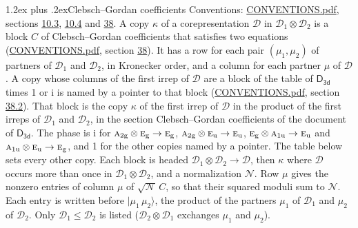 \documentclass[10pt,a4paper]{article}
\makeatletter
\renewcommand\section{\@startsection{section}{1}{\z@}{-3ex plus -1ex minus -.2ex}%
  {1.2ex plus .2ex}{\normalfont\large\sffamily\bfseries\color{parttitle}}}
\numberwithin{equation}{section}
\newcommand{\grp}[1]{\mathsf{#1}}
\newcommand{\irr}[1]{\text{\normalfont\scshape #1}}
\newcommand{\ptag}[1]{\mathrm{#1}}
\newcommand{\iunit}{\mathrm{i}}
\newcommand{\irrprod}{\otimes}
\newcommand{\mult}{\kappa}
\newcommand{\intx}{\mu}
\newcommand{\cgnorm}{\mathcal{N}}
\newcommand{\prodket}[2]{\lvert {#1}\,{#2}\rangle}
\makeatother
\begin{document}
\section{Clebsch--Gordan coefficients}\label{s:clebsch_gordan}
Conventions: \href{../../CONVENTIONS.pdf}{CONVENTIONS.pdf}, sections \href{../../../rotation/CONVENTIONS.pdf\#conv.10.3}{10.3}, \href{../../../rotation/CONVENTIONS.pdf\#conv.10.4}{10.4} and \href{../../CONVENTIONS.pdf\#conv.38}{38}.
\leavevmode\label{n:index.copy}\label{n:matrix.cg.stored}A copy $\mult$ of a corepresentation $\mathcal{D}$ in $\mathcal{D}_1\irrprod\mathcal{D}_2$ is a block $C$ of Clebsch--Gordan coefficients that satisfies two equations (\href{../../CONVENTIONS.pdf}{CONVENTIONS.pdf}, section \href{../../CONVENTIONS.pdf\#conv.38}{38}). \label{n:index.cg}It has a row for each pair $(\intx_1, \intx_2)$ of partners of $\mathcal{D}_1$ and $\mathcal{D}_2$, in Kronecker order, and a column for each partner $\intx$ of $\mathcal{D}$.
A copy whose columns of the first irrep of $\mathcal{D}$ are a block of the table of $\grp{D_{3d}}$ times 1 or $\iunit$ is named by a pointer to that block (\href{../../CONVENTIONS.pdf}{CONVENTIONS.pdf}, section \href{../../CONVENTIONS.pdf\#conv.38.2}{38.2}). That block is the copy $\mult$ of the first irrep of $\mathcal{D}$ in the product of the first irreps of $\mathcal{D}_1$ and $\mathcal{D}_2$, in the section Clebsch--Gordan coefficients of the document of \href{../../../rotation/data/pdf/D3d.pdf}{$\grp{D_{3d}}$}. The phase is $\iunit$ for $\irr{a}_{2\ptag{g}}\irrprod \irr{e}_{\ptag{g}}\to \irr{e}_{\ptag{g}}$, $\irr{a}_{2\ptag{g}}\irrprod \irr{e}_{\ptag{u}}\to \irr{e}_{\ptag{u}}$, $\irr{e}_{\ptag{g}}\irrprod \irr{a}_{1\ptag{u}}\to \irr{e}_{\ptag{u}}$ and $\irr{a}_{1\ptag{u}}\irrprod \irr{e}_{\ptag{u}}\to \irr{e}_{\ptag{g}}$, and 1 for the other copies named by a pointer. The table below sets every other copy.
Each block is headed $\mathcal{D}_1\irrprod\mathcal{D}_2\to\mathcal{D}$, then $\mult$ where $\mathcal{D}$ occurs more than once in $\mathcal{D}_1\irrprod\mathcal{D}_2$, and a normalization $\cgnorm$. Row $\intx$ gives the nonzero entries of column $\intx$ of $\sqrt{\cgnorm}\,C$, so that their squared moduli sum to $\cgnorm$. \label{n:vector.ket.product}Each entry is written before $\prodket{\intx_1}{\intx_2}$, the product of the partners $\intx_1$ of $\mathcal{D}_1$ and $\intx_2$ of $\mathcal{D}_2$. Only $\mathcal{D}_1 \le \mathcal{D}_2$ is listed ($\mathcal{D}_2\irrprod\mathcal{D}_1$ exchanges $\intx_1$ and $\intx_2$).
\end{document}
